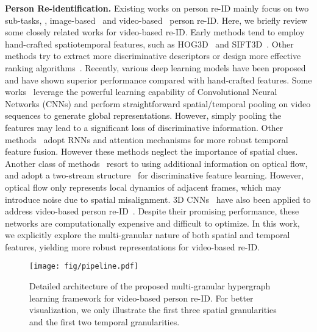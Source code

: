 \documentclass[10pt,twocolumn,letterpaper]{article}
\begin{document}
\textbf{Person Re-identification.}
Existing works on person re-ID mainly focus on two sub-tasks, \ie, image-based~\cite{DBLP:conf/cvpr/GheissariSH06,DBLP:conf/iccv/ZhengSTWWT15,DBLP:conf/cvpr/ZhengZSCYT17,Chen_2017_CVPR,DBLP:conf/cvpr/BaiBT17} and video-based~\cite{DBLP:conf/cvpr/FarenzenaBPMC10,DBLP:conf/cvpr/ZhengGX12} person re-ID. 
Here, we briefly review some closely related works for video-based re-ID. Early methods tend to employ hand-crafted spatiotemporal features, such as HOG3D~\cite{DBLP:conf/bmvc/KlaserMS08} and SIFT3D~\cite{DBLP:conf/mm/ScovannerAS07}. Other methods try to extract more discriminative descriptors\cite{DBLP:conf/iccv/KaranamLR15,DBLP:conf/iccv/LiuMZH15} or design more effective ranking algorithms~\cite{DBLP:conf/eccv/WangGZW14,DBLP:conf/cvpr/YouWLZ16,DBLP:conf/cvpr/BaiTTL19}.
Recently, various deep learning models have been proposed and have shown superior performance compared with hand-crafted features. Some works~\cite{DBLP:conf/eccv/ZhengBSWSWT16,DBLP:conf/eccv/LiZG18a,DBLP:conf/cvpr/WuLDYO018,DBLP:conf/eccv/SuhWTML18,DBLP:conf/cvpr/LiB0W18,DBLP:conf/cvpr/ZhangWZ18,DBLP:conf/cvpr/LiuYO17} leverage the powerful learning capability of Convolutional Neural Networks (CNNs) and perform straightforward spatial/temporal pooling on video sequences to generate global representations. However, simply pooling the features may lead to a significant loss of discriminative information. Other methods~\cite{DBLP:conf/cvpr/McLaughlinRM16,DBLP:conf/eccv/YanNSMYY16,DBLP:conf/cvpr/ZhouHWWT17,DBLP:conf/aaai/LiuYZL19,DBLP:conf/cvpr/ChenLXYW18} adopt RNNs and attention mechanisms for more robust temporal feature fusion. However these methods neglect the importance of spatial clues. Another class of methods~\cite{DBLP:conf/iccv/ChungTD17,DBLP:conf/cvpr/McLaughlinRM16} resort to using additional information on optical flow, and adopt a two-stream structure~\cite{DBLP:conf/nips/SimonyanZ14} for discriminative feature learning. However, optical flow only represents local dynamics of adjacent frames, which may introduce noise due to spatial misalignment. 3D CNNs~\cite{DBLP:conf/icml/JiXYY10,DBLP:conf/iccv/TranBFTP15} have also been applied to address video-based person re-ID~\cite{DBLP:conf/aaai/LiZH19}. Despite their promising performance, these networks are computationally expensive and difficult to optimize. In this work, we explicitly explore the multi-granular nature of both spatial and temporal features, yielding more robust representations for video-based re-ID.

\begin{figure*}[t]
\setlength{\abovecaptionskip}{-0.2mm}
 \centering
 \texttt{[image: fig/pipeline.pdf]}
 \caption{Detailed architecture of the proposed multi-granular hypergraph learning framework for video-based person re-ID. For better visualization, we only illustrate the first three spatial granularities and the first two temporal granularities.}
 \label{fig:method}
 \vspace{-4mm}
\end{figure*}
\end{document}
